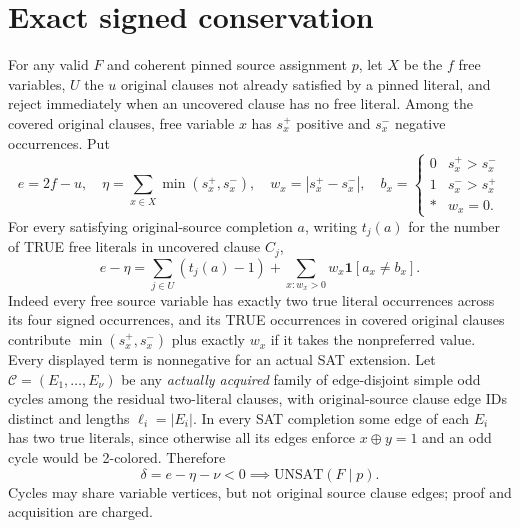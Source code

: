 \documentclass[11pt]{article}
\begin{document}
\section{Exact signed conservation}
For any valid $F$ and coherent pinned source assignment $p$, let $X$ be the $f$ free variables, $U$ the $u$ original clauses not already satisfied by a pinned literal, and reject immediately when an uncovered clause has no free literal. Among the covered original clauses, free variable $x$ has $s_x^+$ positive and $s_x^-$ negative occurrences. Put
\[
e=2f-u,\quad \eta=\sum_{x\in X}\min(s_x^+,s_x^-),\quad w_x=|s_x^+-s_x^-|,
\quad b_x=\begin{cases}0&s_x^+>s_x^-\\1&s_x^->s_x^+\\ *&w_x=0.\end{cases}
\]
For every satisfying original-source completion $a$, writing $t_j(a)$ for the number of TRUE free literals in uncovered clause $C_j$,
\begin{equation}\label{eq:conservation}
e-\eta=\sum_{j\in U}(t_j(a)-1)+\sum_{x:w_x>0}w_x\mathbf 1[a_x\ne b_x].
\end{equation}
Indeed every free source variable has exactly two true literal occurrences across its four signed occurrences, and its TRUE occurrences in covered original clauses contribute $\min(s_x^+,s_x^-)$ plus exactly $w_x$ if it takes the nonpreferred value. Every displayed term is nonnegative for an actual SAT extension.
Let $\mathcal C=(E_1,\ldots,E_\nu)$ be any \emph{actually acquired} family of edge-disjoint simple odd cycles among the residual two-literal clauses, with original-source clause edge IDs distinct and lengths $\ell_i=|E_i|$. In every SAT completion some edge of each $E_i$ has two true literals, since otherwise all its edges enforce $x\oplus y=1$ and an odd cycle would be 2-colored. Therefore
\[
\delta=e-\eta-\nu<0\implies\mathrm{UNSAT}(F\mid p).
\]
Cycles may share variable vertices, but not original source clause edges; proof and acquisition are charged.
\end{document}
